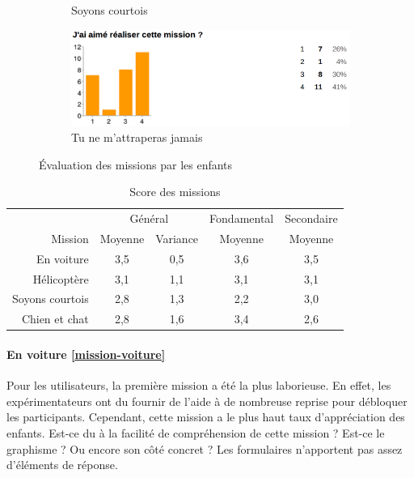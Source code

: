 \begin{figure}
\begin{center}
\begin{subfigure}{.49\textwidth}
      \caption{Soyons courtois}
    \end{subfigure}
    \begin{subfigure}{.49\textwidth}
      \includegraphics[width=\textwidth]{content/8-validation/images/chien}
      \caption{Tu ne m'attraperas jamais}
    \end{subfigure}
    \caption{Évaluation des missions par les enfants}
    \label{fig:evaluation-mission}
  \end{center}
\end{figure}

\begin{table}
  \begin{center}
    \begin{tabular}{r|cc|c|c}
                       & \multicolumn{2}{c|}{Général} & Fondamental & Secondaire \\
      Mission          & Moyenne & Variance           & Moyenne     & Moyenne \\ \hline
      En voiture       & 3,5 & 0,5 & 3,6 & 3,5 \\
      Hélicoptère      & 3,1 & 1,1 & 3,1 & 3,1 \\
      Soyons courtois  & 2,8 & 1,3 & 2,2 & 3,0 \\
      Chien et chat    & 2,8 & 1,6 & 3,4 & 2,6 \\
    \end{tabular}
  \end{center}
  \caption{Score des missions}
  \label{tab:form-missions}
\end{table}

\paragraph{En voiture \ref{mission-voiture}}
Pour les utilisateurs, la première \gls{mission} a été la plus laborieuse. En effet, les expérimentateurs ont du fournir de l'aide à de nombreuse reprise pour débloquer les participants. Cependant, cette \gls{mission} a le plus haut taux d'appréciation des enfants. Est-ce du à la facilité de compréhension de cette \gls{mission} ? Est-ce le graphisme ? Ou encore son côté concret ? Les formulaires n'apportent pas assez d'éléments de réponse.

